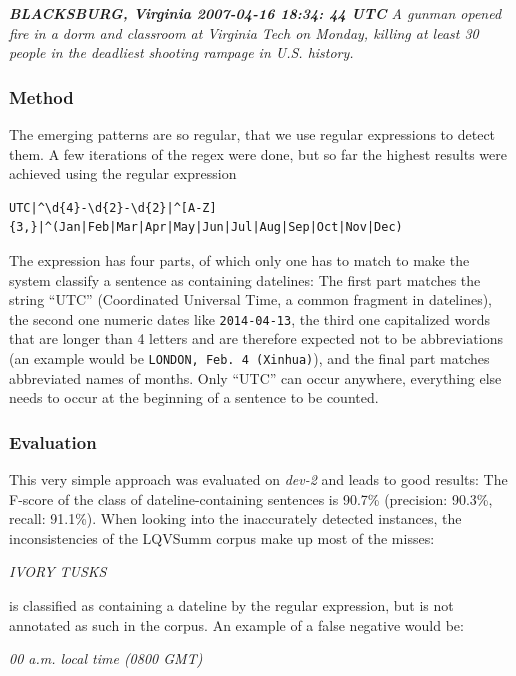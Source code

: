 \documentclass[a4paper,10pt]{scrartcl}
\theoremstyle{style}
\begin{document}
\textit{\textbf{BLACKSBURG, Virginia 2007-04-16 18:34: 44 UTC} A gunman opened fire in a dorm and classroom at Virginia Tech on Monday, killing at least 30 people in the deadliest shooting rampage in U.S. history.}



\subsubsection{Method}
The emerging patterns are so regular, that we use regular expressions to detect them. A few iterations of the regex were done, but so far the highest results were achieved using the regular expression

\begin{lstlisting}
UTC|^\d{4}-\d{2}-\d{2}|^[A-Z]{3,}|^(Jan|Feb|Mar|Apr|May|Jun|Jul|Aug|Sep|Oct|Nov|Dec)
\end{lstlisting}

The expression has four parts, of which only one has to match to make the system classify a sentence as containing datelines: The first part matches the string ``UTC'' (Coordinated Universal Time, a common fragment in datelines), the second one numeric dates like \texttt{2014-04-13}, the third one capitalized words that are longer than 4 letters and are therefore expected not to be abbreviations (an example would be \texttt{LONDON, Feb. 4 (Xinhua)}), and the final part matches abbreviated names of months. Only ``UTC'' can occur anywhere, everything else needs to occur at the beginning of a sentence to be counted.

\subsubsection{Evaluation}
This very simple approach was evaluated on \textit{dev-2} and leads to good results: The F-score of the class of dateline-containing sentences is 90.7\% (precision: 90.3\%, recall: 91.1\%). When looking into the inaccurately detected instances, the inconsistencies of the LQVSumm corpus make up most of the misses:


\textit{IVORY TUSKS}

is classified as containing a dateline by the regular expression, but is not annotated as such in the corpus. An example of a false negative would be:

\textit{00 a.m. local time (0800 GMT)}
\end{document}
